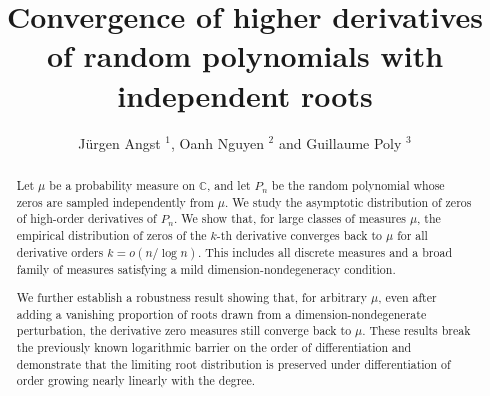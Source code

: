\documentclass[12pt, reqno]{amsart}
\theoremstyle{plain}
\theoremstyle{definition}
\newcommand\C{{\mathbb{C}}}
\begin{document}
\title[Convergence of higher derivatives]{Convergence of higher derivatives of random polynomials with independent roots}


\author{J\"urgen Angst $^1$, Oanh Nguyen $^2$ and Guillaume Poly $^3$}



\address{$^1$ Univ Brest, CNRS UMR 6205, Laboratoire de Mathematiques de Bretagne Atlantique, F--29200 Brest, France} 
\address{$^2$ Division of Applied Mathematics, Brown University, Providence, RI 02906, USA}
\address{$^3$ Nantes Universit\'e, CNRS, Laboratoire de Math\'ematiques Jean Leray, LMJL,
F--44000 Nantes, France.}


\maketitle

 
 \begin{abstract}
 	Let $\mu$ be a probability measure on $\C$, and let $P_n$ be the random polynomial whose zeros are sampled independently from $\mu$. We study the asymptotic distribution of zeros of high-order derivatives of $P_n$. We show that, for large classes of measures $\mu$, the empirical distribution of zeros of the $k$-th derivative converges back to $\mu$ for all derivative orders $k=o(n/\log n)$. This includes all discrete measures and a broad family of measures satisfying a mild dimension-nondegeneracy condition. 
 	
 	We further establish a robustness result showing that, for arbitrary $\mu$, even after adding a vanishing proportion of roots drawn from a dimension-nondegenerate perturbation, the derivative zero measures still converge back to $\mu$. These results break the previously known logarithmic barrier on the order of differentiation and demonstrate that the limiting root distribution is preserved under differentiation of order growing nearly linearly with the degree.
  \end{abstract}
 
 \maketitle
 
\end{document}
